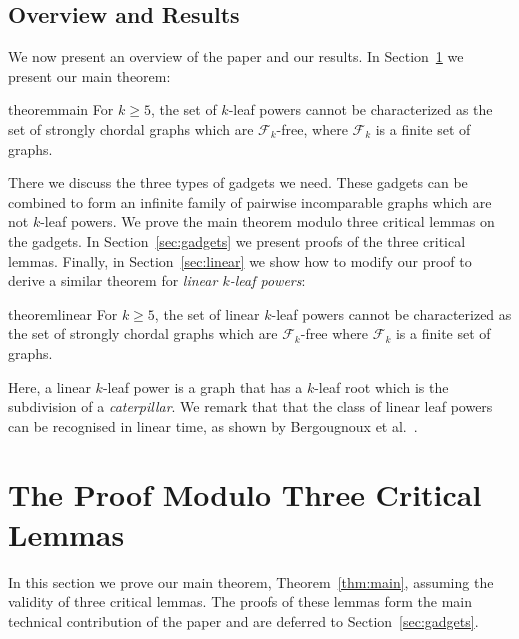 \documentclass[11pt,letter]{article}
\theoremstyle{remark}
\newcommand{\F}{\mathscr{F}}
\begin{document}
\subsection{Overview and Results}
We now present an overview of the paper and our results.
In Section~\ref{sec:proof} we present our main theorem:
\begin{restatable}{theorem}{main}\label{thm:main}
    For $k\geq 5$, the set of $k$-leaf powers cannot be characterized as the set of strongly chordal graphs which are $\F_k$-free, where $\F_k$ is a finite set of graphs.
\end{restatable}

There we discuss the three types of gadgets we need. These gadgets can be combined to form an infinite family of pairwise incomparable graphs which are not $k$-leaf powers.
We prove the main theorem modulo three critical lemmas on the gadgets. 
In Section~\ref{sec:gadgets} we present proofs of the three critical lemmas.
Finally, in Section~\ref{sec:linear} we show how to modify our proof
to derive a similar theorem for \emph{linear $k$-leaf powers}:
\begin{restatable}{theorem}{linear}\label{thm:linear}
    For $k\geq 5$, the set of linear $k$-leaf powers cannot be characterized as the set of strongly chordal graphs which are $\F_k$-free where $\F_k$ is a finite set of graphs.
\end{restatable}
Here, a linear $k$-leaf power is a graph that has a $k$-leaf root which is the subdivision of a \emph{caterpillar}. We remark that that the class of linear leaf powers can be recognised in linear time, as shown by Bergougnoux et al.~\cite{Bergougnoux}.




\section{The Proof Modulo Three Critical Lemmas}\label{sec:proof}

In this section we prove our main theorem, Theorem~\ref{thm:main},
assuming the validity of three critical lemmas.
The proofs of these lemmas form the main technical contribution of the paper and are deferred to Section~\ref{sec:gadgets}.
\end{document}
